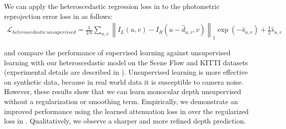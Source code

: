 We can apply the heteroscedastic regression loss in  to the photometric reprojection error loss in  as follows:
\begin{multline}
\mathcal{L}_{heteroscedastic~unsupervised} = \frac{1}{2N} \sum_{u,v} \left\lVert I_L(u,v) - I_R(u-\hat{d}_{u,v},v) \right\rVert_1 \exp (-\hat{s}_{u,v}) + \frac{1}{2}\hat{s}_{u,v}
\label{eqn:aleatoric_unsupervised_loss}
\end{multline}

 and  compare the performance of supervised learning against unsupervised learning with our heteroscedastic model on the Scene Flow and KITTI datasets (experimental details are described in ). Unsupervised learning is more effective on synthetic data, because in real world data it is susceptible to camera noise. However, these results show that we can learn monocular depth unsupervised without a regularization or smoothing term. Empirically, we demonstrate an improved performance using the learned attenuation loss in  over the regularized loss in . Qualitatively, we observe a sharper and more refined depth prediction.

